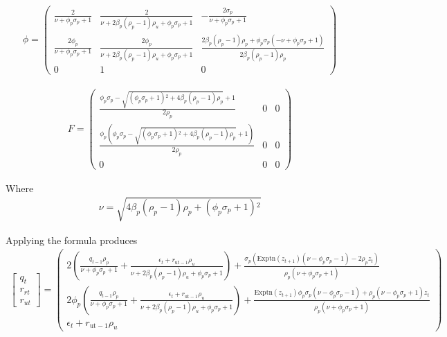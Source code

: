 \documentclass[12pt]{article}
\begin{document}
\begin{gather*}
  \phi=   \left(
   \begin{array}{ccc}
    \frac{2}{\nu +\phi _p \sigma _p+1} & \frac{2}{\nu +2 \beta _p \left(\rho
      _p-1\right) \rho _u+\phi _p \sigma _p+1} & -\frac{2 \sigma _p}{\nu +\phi
      _p \sigma _p+1} \\
    \frac{2 \phi _p}{\nu +\phi _p \sigma _p+1} & \frac{2 \phi _p}{\nu +2 \beta
      _p \left(\rho _p-1\right) \rho _u+\phi _p \sigma _p+1} & \frac{2 \beta
      _p \left(\rho _p-1\right) \rho _p+\phi _p \sigma _p \left(-\nu +\phi _p
      \sigma _p+1\right)}{2 \beta _p \left(\rho _p-1\right) \rho _p} \\
    0 & 1 & 0
   \end{array}
   \right)
\end{gather*}

\begin{gather*}
  F=    \left(
   \begin{array}{ccc}
    \frac{\phi _p \sigma _p-\sqrt{\left(\phi _p \sigma _p+1\right){}^2+4 \beta
      _p \left(\rho _p-1\right) \rho _p}+1}{2 \rho _p} & 0 & 0 \\
    \frac{\phi _p \left(\phi _p \sigma _p-\sqrt{\left(\phi _p \sigma
      _p+1\right){}^2+4 \beta _p \left(\rho _p-1\right) \rho _p}+1\right)}{2
      \rho _p} & 0 & 0 \\
    0 & 0 & 0
   \end{array}
   \right)
\end{gather*}

Where
\begin{gather*}
  \nu=    \sqrt{4 \beta _p \left(\rho _p-1\right) \rho _p+\left(\phi _p \sigma
    _p+1\right){}^2}
\end{gather*}

\newcommand{\tVec}{
  \begin{bmatrix}
    q_t\\r_{rt}\\r_{ut}
  \end{bmatrix}}


Applying the formula produces
\begin{gather*}
\tVec=      \left(
   \begin{array}{c}
    2 \left(\frac{q_{t-1} \rho _p}{\nu +\phi _p \sigma _p+1}+\frac{\epsilon
      _t+r_{\text{ut}-1} \rho _u}{\nu +2 \beta _p \left(\rho _p-1\right) \rho
      _u+\phi _p \sigma _p+1}\right)+\frac{\sigma _p
      \left(\text{Exptn}\left(z_{t+1}\right) \left(\nu -\phi _p \sigma
      _p-1\right)-2 \rho _p z_t\right)}{\rho _p \left(\nu +\phi _p \sigma
      _p+1\right)} \\
    2 \phi _p \left(\frac{q_{t-1} \rho _p}{\nu +\phi _p \sigma
      _p+1}+\frac{\epsilon _t+r_{\text{ut}-1} \rho _u}{\nu +2 \beta _p
      \left(\rho _p-1\right) \rho _u+\phi _p \sigma
      _p+1}\right)+\frac{\text{Exptn}\left(z_{t+1}\right) \phi _p \sigma _p
      \left(\nu -\phi _p \sigma _p-1\right)+\rho _p \left(\nu -\phi _p \sigma
      _p+1\right) z_t}{\rho _p \left(\nu +\phi _p \sigma _p+1\right)} \\
    \epsilon _t+r_{\text{ut}-1} \rho _u
   \end{array}
   \right)
\end{gather*}
\end{document}
